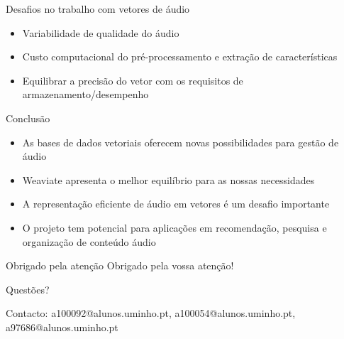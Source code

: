 \documentclass{beamer}
\begin{document}
\begin{frame}{Desafios no trabalho com vetores de áudio}
    \begin{itemize}
        \item Variabilidade de qualidade do áudio
        \item Custo computacional do pré-processamento e extração de características
        \item Equilibrar a precisão do vetor com os requisitos de armazenamento/desempenho
    \end{itemize}
\end{frame}



\begin{frame}{Conclusão}
    \begin{itemize}
        \item As bases de dados vetoriais oferecem novas possibilidades para gestão de áudio
        \item Weaviate apresenta o melhor equilíbrio para as nossas necessidades
        \item A representação eficiente de áudio em vetores é um desafio importante
        \item O projeto tem potencial para aplicações em recomendação, pesquisa e organização de conteúdo áudio
    \end{itemize}
\end{frame}

\begin{frame}{Obrigado pela atenção}
    \centering
    \Large Obrigado pela vossa atenção!
    
    \vspace{1cm}
    
    \normalsize
    Questões?
    
    \vspace{1cm}
    
    \small
    Contacto: a100092@alunos.uminho.pt, a100054@alunos.uminho.pt, a97686@alunos.uminho.pt

    

\end{frame}
\end{document}

